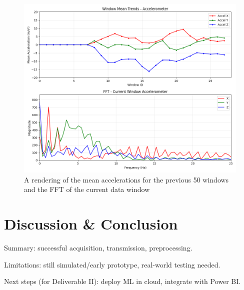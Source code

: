 \documentclass[conference]{IEEEtran}
\begin{document}
\begin{figure}[h]
	\centering
	\includegraphics[width=0.9\columnwidth]{media/Figure_2.png}
	\caption{A rendering of the mean accelerations for the previous 50 windows and the FFT of the current data window}
	\label{fig:extracted_data}
\end{figure}

\section{Discussion \& Conclusion}
Summary: successful acquisition, transmission, preprocessing.

Limitations: still simulated/early prototype, real-world testing needed.

Next steps (for Deliverable II): deploy ML in cloud, integrate with Power BI.




\onecolumn

\appendices
\end{document}

